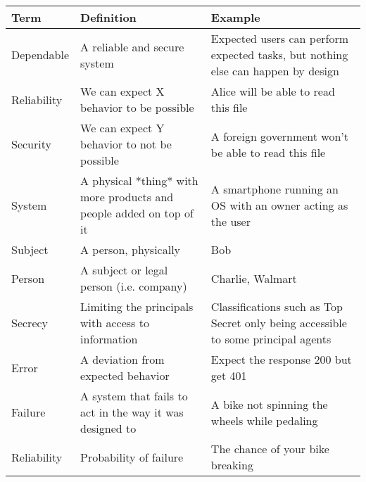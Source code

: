 




\begin{tabularx}{\textwidth}{|l|X|X|}
    \hline
    \textbf{Term}   & \textbf{Definition}                                                 & \textbf{Example}                                                                  \\ \hline
    Dependable      & A reliable and secure system                                        & Expected users can perform expected tasks, but nothing else can happen by design  \\ \hline
    Reliability     & We can expect X behavior to be possible                             & Alice will be able to read this file                                              \\ \hline
    Security        & We can expect Y behavior to not be possible                         & A foreign government won't be able to read this file                              \\ \hline
    System          & A physical *thing* with more products and people added on top of it & A smartphone running an OS with an owner acting as the user                       \\ \hline
    Subject         & A person, physically                                                & Bob                                                                               \\ \hline
    Person          & A subject or legal person (i.e. company)                            & Charlie, Walmart                                                                  \\ \hline
    Secrecy         & Limiting the principals with access to information                  & Classifications such as Top Secret only being accessible to some principal agents \\ \hline
    Error           & A deviation from expected behavior                                  & Expect the response 200 but get 401                                               \\ \hline
    Failure         & A system that fails to act in the way it was designed to            & A bike not spinning the wheels while pedaling                                     \\ \hline
    Reliability     & Probability of failure                                              & The chance of your bike breaking                                                  \\ \hline

\end{tabularx}
